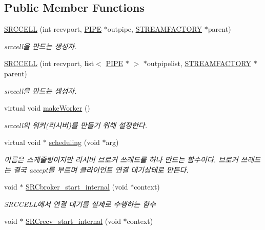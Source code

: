 \subsection*{Public Member Functions}
\begin{DoxyCompactItemize}
\item 
\hyperlink{classSRCCELL_aedfd1c4aaa22c4e44ec89d2c49d67fbb}{S\+R\+C\+C\+E\+L\+L} (int recvport, \hyperlink{classPIPE}{P\+I\+P\+E} $\ast$outpipe, \hyperlink{classSTREAMFACTORY}{S\+T\+R\+E\+A\+M\+F\+A\+C\+T\+O\+R\+Y} $\ast$parent)
\begin{DoxyCompactList}\small\item\em srccell을 만드는 생성자. \end{DoxyCompactList}\item 
\hyperlink{classSRCCELL_a5c02cc02b621822b707a144aedbf5464}{S\+R\+C\+C\+E\+L\+L} (int recvport, list$<$ \hyperlink{classPIPE}{P\+I\+P\+E} $\ast$ $>$ $\ast$outpipelist, \hyperlink{classSTREAMFACTORY}{S\+T\+R\+E\+A\+M\+F\+A\+C\+T\+O\+R\+Y} $\ast$parent)
\begin{DoxyCompactList}\small\item\em srccell을 만드는 생성자. \end{DoxyCompactList}\item 
virtual void \hyperlink{classSRCCELL_a08f5dfcdead7c32e0de8967b8058f879}{make\+Worker} ()
\begin{DoxyCompactList}\small\item\em srccell의 워커(리시버)를 만들기 위해 설정한다. \end{DoxyCompactList}\item 
virtual void $\ast$ \hyperlink{classSRCCELL_afa53082be31a5d956ca4fdc65b606d66}{scheduling} (void $\ast$arg)
\begin{DoxyCompactList}\small\item\em 이름은 스케줄링이지만 리시버 브로커 쓰레드를 하나 만드는 함수이다. 브로커 쓰레드는 결국 accept를 부르며 클라이언트 연결 대기상태로 만든다. \end{DoxyCompactList}\item 
void $\ast$ \hyperlink{classSRCCELL_a895f7188ce30ab376543a63d9b40740a}{S\+R\+Cbroker\+\_\+start\+\_\+internal} (void $\ast$context)
\begin{DoxyCompactList}\small\item\em S\+R\+C\+C\+E\+L\+L에서 연결 대기를 실제로 수행하는 함수 \end{DoxyCompactList}\item 
void $\ast$ \hyperlink{classSRCCELL_acb7e9826f55fb07c8bae67889ae2d671}{S\+R\+Crecv\+\_\+start\+\_\+internal} (void $\ast$context)

\end{DoxyCompactItemize}
